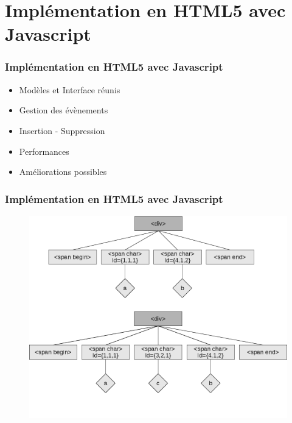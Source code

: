 \section{Implémentation en HTML5 avec Javascript}
  \begin{frame}
    \frametitle{Implémentation en HTML5 avec Javascript}
    \begin{itemize}
      \item Modèles et Interface réunis
      \item Gestion des évènements
      \item Insertion - Suppression
      \item Performances
      \item Améliorations possibles
    \end{itemize}
  \end{frame}
  
  \begin{frame}
    \frametitle{Implémentation en HTML5 avec Javascript}
	  \begin{figure}
		\center
		\includegraphics[scale=0.30]{insertionhtml}
	  \end{figure}
  \end{frame}

